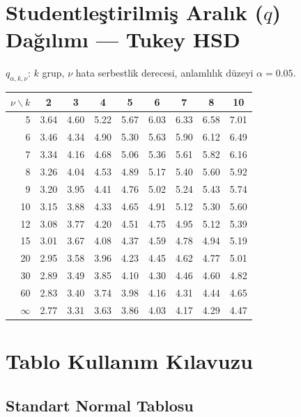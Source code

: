 \section{Studentleştirilmiş Aralık ($q$) Dağılımı — Tukey HSD}
\label{app:q_tablo}

$q_{\alpha,k,\nu}$: $k$ grup, $\nu$ hata serbestlik derecesi, anlamlılık düzeyi $\alpha=0.05$.

\begin{center}
\small
\renewcommand{\arraystretch}{1.12}
\begin{tabular}{r|cccccccc}
\hline
$\nu \backslash k$ & 2 & 3 & 4 & 5 & 6 & 7 & 8 & 10 \\
\hline
5  & 3.64 & 4.60 & 5.22 & 5.67 & 6.03 & 6.33 & 6.58 & 7.01 \\
6  & 3.46 & 4.34 & 4.90 & 5.30 & 5.63 & 5.90 & 6.12 & 6.49 \\
7  & 3.34 & 4.16 & 4.68 & 5.06 & 5.36 & 5.61 & 5.82 & 6.16 \\
8  & 3.26 & 4.04 & 4.53 & 4.89 & 5.17 & 5.40 & 5.60 & 5.92 \\
9  & 3.20 & 3.95 & 4.41 & 4.76 & 5.02 & 5.24 & 5.43 & 5.74 \\
10 & 3.15 & 3.88 & 4.33 & 4.65 & 4.91 & 5.12 & 5.30 & 5.60 \\
12 & 3.08 & 3.77 & 4.20 & 4.51 & 4.75 & 4.95 & 5.12 & 5.39 \\
15 & 3.01 & 3.67 & 4.08 & 4.37 & 4.59 & 4.78 & 4.94 & 5.19 \\
20 & 2.95 & 3.58 & 3.96 & 4.23 & 4.45 & 4.62 & 4.77 & 5.01 \\
30 & 2.89 & 3.49 & 3.85 & 4.10 & 4.30 & 4.46 & 4.60 & 4.82 \\
60 & 2.83 & 3.40 & 3.74 & 3.98 & 4.16 & 4.31 & 4.44 & 4.65 \\
$\infty$ & 2.77 & 3.31 & 3.63 & 3.86 & 4.03 & 4.17 & 4.29 & 4.47 \\
\hline
\end{tabular}
\end{center}

\section{Tablo Kullanım Kılavuzu}
\label{app:tablo_kilavuz}

\subsection{Standart Normal Tablosu}

